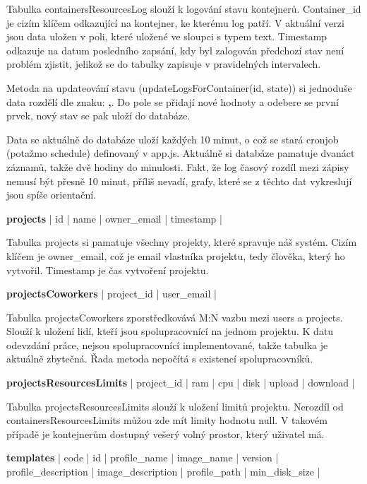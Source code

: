 \documentclass[a4paper,oneside,12pt]{report}
\begin{document}
Tabulka containersResourcesLog slouží k logování stavu kontejnerů.
Container\_id je cizím klíčem odkazující na kontejner, ke kterému log patří.
V aktuální verzi jsou data uložen v poli, které uložené ve sloupci s typem text.
Timestamp odkazuje na datum posledního zapsání, kdy byl zalogován předchozí stav není problém zjistit, jelikož se do tabulky zapisuje v pravidelných intervalech.

Metoda na updateování stavu (updateLogsForContainer(id, state)) si jednoduše data rozdělí dle znaku: \textbf{,}.
Do pole se přidají nové hodnoty a odebere se první prvek, nový stav se pak uloží do databáze.

Data se aktuálně do databáze uloží každých 10 minut, o což se stará cronjob (potažmo schedule) definovaný v app.js.
Aktuálně si databáze pamatuje dvanáct záznamů, takže dvě hodiny do minulosti.
Fakt, že log časový rozdíl mezi zápisy nemusí být přesně 10 minut, příliš nevadí, grafy, které se z těchto dat vykreslují jsou spíše orientační.


\vspace{0.3cm}
\noindent
\textbf{projects} | id | name | owner\_email | timestamp |

Tabulka projects si pamatuje všechny projekty, které spravuje náš systém.
Cizím klíčem je owner\_email, což je email vlastníka projektu, tedy člověka, který ho vytvořil.
Timestamp je čas vytvoření projektu.

\vspace{0.3cm}
\noindent
\textbf{projectsCoworkers} | project\_id | user\_email |

Tabulka projectsCoworkers zporstředkovává M:N vazbu mezi users a projects.
Slouží k uložení lidí, kteří jsou spolupracovnící na jednom projektu.
K datu odevzdání práce, nejsou spolupracovnící implementované, takže tabulka je aktuálně zbytečná.
Řada metoda nepočítá s existencí spolupracovníků.

\vspace{0.3cm}
\noindent
\textbf{projectsResourcesLimits} | project\_id | ram | cpu | disk | upload | download |

Tabulka projectsResourcesLimits slouží k uložení limitů projektu.
Nerozdíl od containersResourcesLimits můžou zde mít limity hodnotu null.
V takovém případě je kontejnerům dostupný vešerý volný prostor, který uživatel má.

\vspace{0.3cm}
\noindent
\textbf{templates} | code | id | profile\_name | image\_name | version | profile\_description | image\_description | profile\_path | min\_disk\_size |
\end{document}
